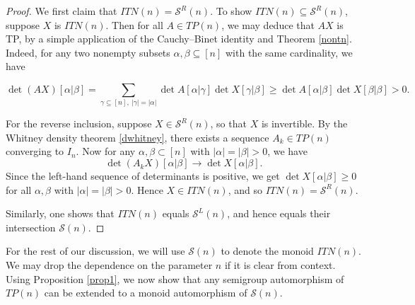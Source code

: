 \documentclass[11pt,reqno]{amsart}
\theoremstyle{plain}
\theoremstyle{definition}
\numberwithin{equation}{section}
\def\cS{\mathcal S}
\begin{document}
\begin{proof}
We first claim that $ITN(n)=\cS^R(n)$. To show  $ITN(n) \subseteq \cS^R(n)$, suppose $X$ is $ITN(n)$. Then for all $A \in TP(n)$, we may deduce that $AX$ is TP, by a simple application of the Cauchy--Binet identity and Theorem \ref{nontn}. Indeed, for any two nonempty  subsets $\alpha, \beta \subseteq [n]$ with the same cardinality, we have

\[ \det (AX)[\alpha|\beta] = \sum_{\gamma\subseteq [n], ~|\gamma|=|\alpha|} \det A[\alpha|\gamma] \det X[\gamma|\beta] \geq \det A[\alpha|\beta] \det X[\beta|\beta] >0. \]



For the reverse inclusion, suppose $X\in \cS^R(n)$, so that $X$ is invertible. By the Whitney density theorem \ref{dwhitney}, there exists a sequence $A_k \in TP(n)$ converging to $I_n$.  Now for any $\alpha, \beta \subset [n]$ with $|\alpha| = |\beta|>0$, we have
\[
\det (A_k X) [ \alpha | \beta ] \to \det X [\alpha | \beta].
\]
Since the left-hand sequence of determinants is positive, we get $\det X [\alpha | \beta] \geq 0$ for all $\alpha,\beta$ with $|\alpha| = |\beta|>0$. Hence $X \in ITN(n)$, and so $ITN(n)=\cS^R(n)$.

Similarly, one shows that $ITN(n)$ equals $\cS^L(n)$, and hence equals their intersection $\cS(n)$.
\end{proof}

For the rest of our discussion, we will use $\cS(n)$ to denote the monoid $ITN(n)$. We may drop the dependence on the parameter $n$ if it is clear from context. Using Proposition \ref{prop1}, we now show that any semigroup automorphism of $TP(n)$ can be extended to a monoid automorphism of $\cS(n)$.
\end{document}
